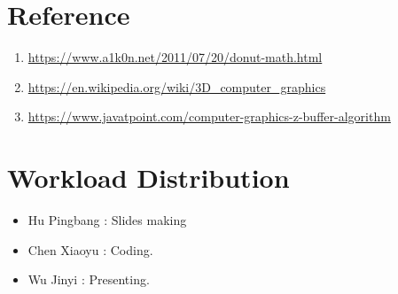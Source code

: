\documentclass{article}
\begin{document}
\section{Reference}

\begin{enumerate}
  \item \url{https://www.a1k0n.net/2011/07/20/donut-math.html}
  \item \url{https://en.wikipedia.org/wiki/3D_computer_graphics}
  \item \url{https://www.javatpoint.com/computer-graphics-z-buffer-algorithm}
\end{enumerate}

\section{Workload Distribution}
\begin{itemize}
  \item Hu Pingbang : Slides making
  \item Chen Xiaoyu : Coding.
  \item Wu Jinyi : Presenting.
\end{itemize}
\end{document}
